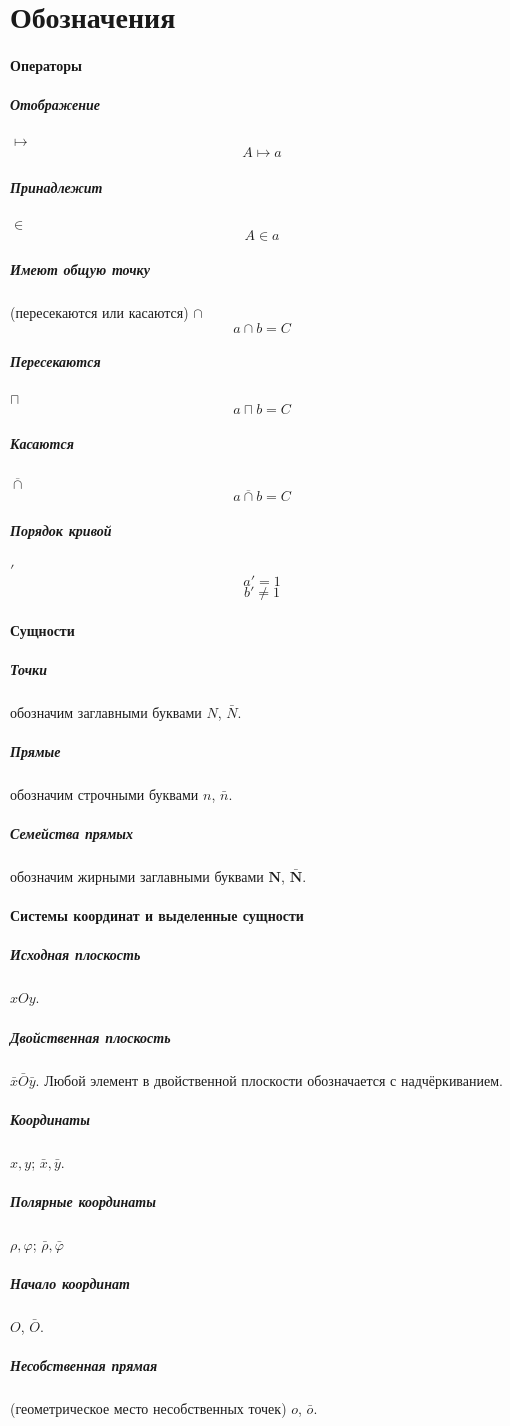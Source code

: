 
\section{Обозначения}
\paragraph{Операторы}
\subparagraph{Отображение} $\mapsto$
$$A\mapsto a$$
\subparagraph{Принадлежит} $\in$
$$A \in a$$
\subparagraph{Имеют общую точку} (пересекаются или касаются) $\cap$
$$a \cap b = C$$
\subparagraph{Пересекаются} $\sqcap$
$$a \sqcap b = C$$
\subparagraph{Касаются} $\overline\cap$
$$a \overline\cap b = C$$
\subparagraph{Порядок кривой} $'$ 
$$a' = 1$$
$$b' \ne 1$$

\paragraph{Сущности}
\subparagraph{Точки} обозначим заглавными буквами $N$, $\bar{N}$.
\subparagraph{Прямые} обозначим строчными буквами $n$, $\bar{n}$.
\subparagraph{Семейства прямых} обозначим жирными заглавными буквами $\mathbf{N}$, $\mathbf{\bar{N}}$.

\paragraph{Системы координат и выделенные сущности}
\subparagraph{Исходная плоскость} $xOy$.
\subparagraph{Двойственная плоскость} $\bar{x}\bar{O}\bar{y}$. Любой элемент в двойственной плоскости обозначается с надчёркиванием.
\subparagraph{Координаты} $x, y$; $\bar{x}, \bar{y}$.
\subparagraph{Полярные координаты} $\rho, \varphi$; $\bar\rho, \bar\varphi$
\subparagraph{Начало координат} $O$, $\bar{O}$.
\subparagraph{Несобственная прямая} (геометрическое место несобственных точек) $o$, $\bar{o}$.


